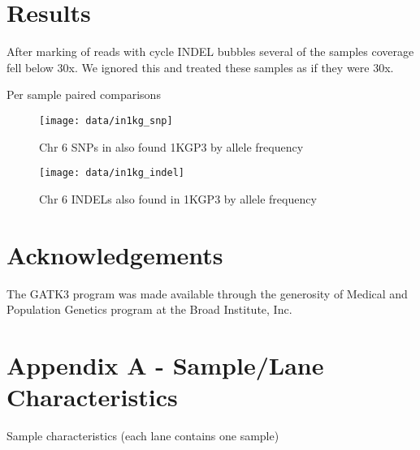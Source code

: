 \documentclass{article}
\begin{document}
  \section{Results}
  After marking of reads with cycle INDEL bubbles several of the samples
  coverage fell below 30x. We ignored this and treated these samples as if they
  were 30x.
  \begin{table}[!h]
    \begin{center}
      \label{psc_table}
      \caption{Per sample paired comparisons}
    \end{center}
  \end{table}

  \begin{figure}
    \caption{Chr 6 SNPs in also found 1KGP3 by allele frequency}
    \texttt{[image: data/in1kg\_snp]}
  \end{figure}
  \begin{figure}
    \caption{Chr 6 INDELs also found in 1KGP3 by allele frequency}
    \texttt{[image: data/in1kg\_indel]}
  \end{figure}

  \section{Acknowledgements}
  The GATK3 program was made available through the generosity of Medical and
  Population Genetics program at the Broad Institute, Inc.

  \newpage
  \section{Appendix A - Sample/Lane Characteristics}
  \begin{table}[!h]
    \begin{center}
      \label{sample_table}
      \caption{Sample characteristics (each lane contains one sample)}
    \end{center}
  \end{table}
\end{document}
